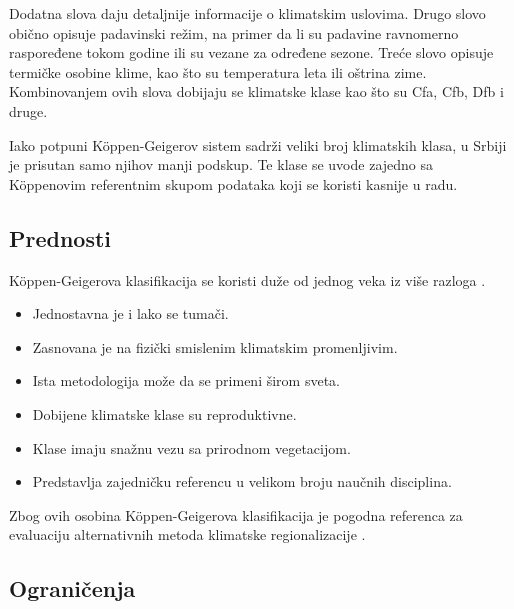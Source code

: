 \documentclass[11pt]{article}
\begin{document}
Dodatna slova daju detaljnije informacije o klimatskim uslovima. Drugo slovo obično opisuje padavinski režim, na primer da li su padavine ravnomerno raspoređene tokom godine ili su vezane za određene sezone. Treće slovo opisuje termičke osobine klime, kao što su temperatura leta ili oštrina zime. Kombinovanjem ovih slova dobijaju se klimatske klase kao što su Cfa, Cfb, Dfb i druge.

Iako potpuni Köppen-Geigerov sistem sadrži veliki broj klimatskih klasa, u Srbiji je prisutan samo njihov manji podskup. Te klase se uvode zajedno sa Köppenovim referentnim skupom podataka koji se koristi kasnije u radu.

\subsection{Prednosti}

Köppen-Geigerova klasifikacija se koristi duže od jednog veka iz više razloga \cite{peel2007,beck2018}.

\begin{itemize}
    \item Jednostavna je i lako se tumači.
    \item Zasnovana je na fizički smislenim klimatskim promenljivim.
    \item Ista metodologija može da se primeni širom sveta.
    \item Dobijene klimatske klase su reproduktivne.
    \item Klase imaju snažnu vezu sa prirodnom vegetacijom.
    \item Predstavlja zajedničku referencu u velikom broju naučnih disciplina.
\end{itemize}

Zbog ovih osobina Köppen-Geigerova klasifikacija je pogodna referenca za evaluaciju alternativnih metoda klimatske regionalizacije \cite{peel2007,beck2018}.

\subsection{Ograničenja}
\end{document}
